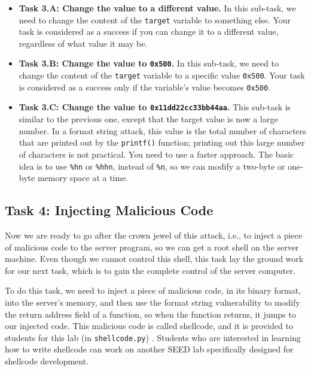 \begin{itemize}
\item \textbf{Task 3.A: Change the value to a different value.}
In this sub-task, we need to change the content of the \texttt{target} variable
to something else. Your task is considered as a success if you can change it to a
different value, regardless of what value it may be.


\item \textbf{Task 3.B: Change the value to \texttt{0x500}.}
In this sub-task, we need to change the content of the \texttt{target} variable
to a specific value \texttt{0x500}. Your task is considered as
a success only if the variable's value becomes \texttt{0x500}.


\item \textbf{Task 3.C: Change the value to \texttt{0x11dd22cc33bb44aa}.}
This sub-task is similar to the previous one, except that the target value is
now a large number. In a format string attack, this
value is the total number of characters that
are printed out by the \texttt{printf()} function; printing out
this large number of characters is not practical. You need to use a faster approach. The
basic idea is to use \texttt{\%hn} or \texttt{\%hhn}, 
instead of \texttt{\%n}, so we can modify
a two-byte or one-byte memory space at a time. 
\end{itemize}



\subsection{Task 4: Injecting Malicious Code}

Now we are ready to go after the crown jewel of this attack, i.e., to
inject a piece of malicious code to the server program, so we can 
get a root shell on the server machine. Even though we cannot 
control this shell, this task lay the ground work for our next task, 
which is to gain the complete control
of the server computer.

To do this task, we need to inject a piece of malicious code, in its binary format,
into the server's memory, and then use the format string vulnerability
to modify the return address field of a function, so when the function returns,
it jumps to our injected code. This malicious code is called shellcode,
and it is provided to students for this lab (in \texttt{shellcode.py}) .
Students who are interested in learning 
how to write shellcode can work on another SEED lab specifically 
designed for shellcode development. 


